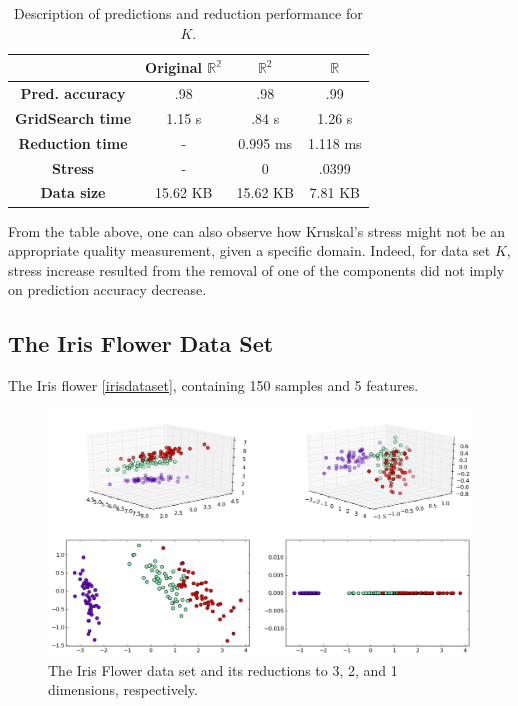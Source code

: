 \documentclass[12pt]{report}
\begin{document}
\begin{table}[H]
	\centering
	\begin{tabular}{|c|c|c|c|}
		\hline
		& \textbf{Original $\mathbb{R^2}$} & \textbf{$\mathbb{R}^2$} & \textbf{$\mathbb{R}$} \\\hline
		\textbf{Pred. accuracy} & .98 & .98 & .99 \\\hline
		\textbf{GridSearch time} & 1.15 s & .84 s & 1.26 s \\\hline
		\textbf{Reduction time} & - & 0.995 ms & 1.118 ms \\\hline
		\textbf{Stress} & - & 0 & .0399 \\\hline
		\textbf{Data size} & 15.62 KB & 15.62 KB & 7.81 KB \\\hline
	\end{tabular}
	\caption{Description of predictions and reduction performance for $K$.}
\end{table}

From the table above, one can also observe how Kruskal's stress might not be an appropriate quality measurement, given a specific domain. Indeed, for data set $K$, stress increase resulted from the removal of one of the components did not imply on prediction accuracy decrease.

\subsection{The Iris Flower Data Set}

The Iris flower \ref{irisdataset}, containing 150 samples and 5 features.

\begin{figure}[H]
	\centering
	\captionsetup{justification=centering}

	\includegraphics[width=\linewidth]{experiments/pca_iris}
	\caption{The Iris Flower data set and its reductions to 3, 2, and 1 dimensions, respectively.}
	\label{fig:dsirispca}
\end{figure}
\end{document}
